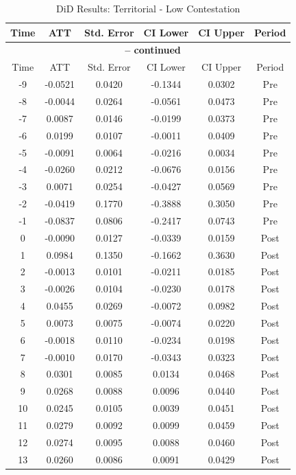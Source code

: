 \documentclass[bibtex]{article}
\begin{document}
{\begin{longtable}{cccccc}
\caption{DiD Results: Territorial - Low Contestation} \label{tab:terr_low} \\
\toprule
Time & ATT & Std. Error & CI Lower & CI Upper & Period \\
\midrule
\endfirsthead
\multicolumn{6}{c}{{\bfseries \tablename\ \thetable{} -- continued}} \\
\toprule
Time & ATT & Std. Error & CI Lower & CI Upper & Period \\
\midrule
\endhead
-9 & -0.0521 & 0.0420 & -0.1344 & 0.0302 & Pre \\
-8 & -0.0044 & 0.0264 & -0.0561 & 0.0473 & Pre \\
-7 & 0.0087 & 0.0146 & -0.0199 & 0.0373 & Pre \\
-6 & 0.0199 & 0.0107 & -0.0011 & 0.0409 & Pre \\
-5 & -0.0091 & 0.0064 & -0.0216 & 0.0034 & Pre \\
-4 & -0.0260 & 0.0212 & -0.0676 & 0.0156 & Pre \\
-3 & 0.0071 & 0.0254 & -0.0427 & 0.0569 & Pre \\
-2 & -0.0419 & 0.1770 & -0.3888 & 0.3050 & Pre \\
-1 & -0.0837 & 0.0806 & -0.2417 & 0.0743 & Pre \\
0 & -0.0090 & 0.0127 & -0.0339 & 0.0159 & Post \\
1 & 0.0984 & 0.1350 & -0.1662 & 0.3630 & Post \\
2 & -0.0013 & 0.0101 & -0.0211 & 0.0185 & Post \\
3 & -0.0026 & 0.0104 & -0.0230 & 0.0178 & Post \\
4 & 0.0455 & 0.0269 & -0.0072 & 0.0982 & Post \\
5 & 0.0073 & 0.0075 & -0.0074 & 0.0220 & Post \\
6 & -0.0018 & 0.0110 & -0.0234 & 0.0198 & Post \\
7 & -0.0010 & 0.0170 & -0.0343 & 0.0323 & Post \\
8 & 0.0301 & 0.0085 & 0.0134 & 0.0468 & Post \\
9 & 0.0268 & 0.0088 & 0.0096 & 0.0440 & Post \\
10 & 0.0245 & 0.0105 & 0.0039 & 0.0451 & Post \\
11 & 0.0279 & 0.0092 & 0.0099 & 0.0459 & Post \\
12 & 0.0274 & 0.0095 & 0.0088 & 0.0460 & Post \\
13 & 0.0260 & 0.0086 & 0.0091 & 0.0429 & Post \\

\end{longtable}}
\end{document}
